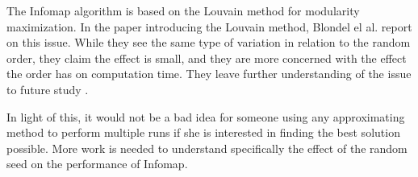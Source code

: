 The Infomap algorithm is based on the Louvain method for modularity
maximization. In the paper introducing the Louvain method, Blondel el
al. report on this issue. While they see the same type of variation in
relation to the random order, they claim the effect is small, and they
are more concerned with the effect the order has on computation time.
They leave further understanding of the issue to future study
\autocite{blondel_fast_2008}.

In light of this, it would not be a bad idea for someone using any
approximating method to perform multiple runs if she is interested in
finding the best solution possible. More work is needed to understand
specifically the effect of the random seed on the performance of
Infomap.
